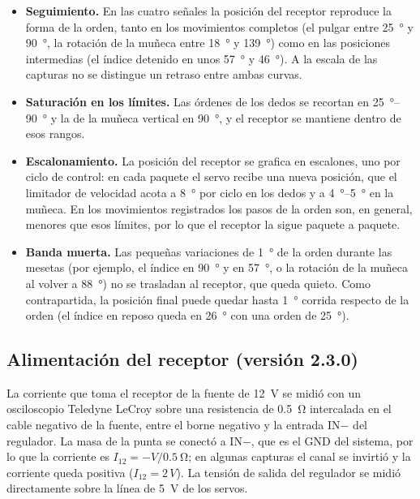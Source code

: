 \begin{itemize}
    \item \textbf{Seguimiento.} En las cuatro señales la posición del receptor reproduce la forma de la orden, tanto en los movimientos completos (el pulgar entre \SI{25}{\degree} y \SI{90}{\degree}, la rotación de la muñeca entre \SI{18}{\degree} y \SI{139}{\degree}) como en las posiciones intermedias (el índice detenido en unos \SI{57}{\degree} y \SI{46}{\degree}). A la escala de las capturas no se distingue un retraso entre ambas curvas.
    \item \textbf{Saturación en los límites.} Las órdenes de los dedos se recortan en \SIrange{25}{90}{\degree} y la de la muñeca vertical en \SI{90}{\degree}, y el receptor se mantiene dentro de esos rangos.
    \item \textbf{Escalonamiento.} La posición del receptor se grafica en escalones, uno por ciclo de control: en cada paquete el servo recibe una nueva posición, que el limitador de velocidad acota a \SI{8}{\degree} por ciclo en los dedos y a \SIrange{4}{5}{\degree} en la muñeca. En los movimientos registrados los pasos de la orden son, en general, menores que esos límites, por lo que el receptor la sigue paquete a paquete.
    \item \textbf{Banda muerta.} Las pequeñas variaciones de \SI{1}{\degree} de la orden durante las mesetas (por ejemplo, el índice en \SI{90}{\degree} y en \SI{57}{\degree}, o la rotación de la muñeca al volver a \SI{88}{\degree}) no se trasladan al receptor, que queda quieto. Como contrapartida, la posición final puede quedar hasta \SI{1}{\degree} corrida respecto de la orden (el índice en reposo queda en \SI{26}{\degree} con una orden de \SI{25}{\degree}).
\end{itemize}

\subsection{Alimentación del receptor (versión 2.3.0)}
\label{sec:pruebas_alimentacion}

La corriente que toma el receptor de la fuente de \SI{12}{\volt} se midió con un osciloscopio Teledyne LeCroy sobre una resistencia de \SI{0.5}{\ohm} intercalada en el cable negativo de la fuente, entre el borne negativo y la entrada IN$-$ del regulador. La masa de la punta se conectó a IN$-$, que es el GND del sistema, por lo que la corriente es $I_{12} = -V/\SI{0.5}{\ohm}$; en algunas capturas el canal se invirtió y la corriente queda positiva ($I_{12} = 2\,V$). La tensión de salida del regulador se midió directamente sobre la línea de \SI{5}{\volt} de los servos.

